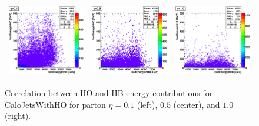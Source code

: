 \documentclass{cmspaper}
\begin{document}
\begin{figure}
 \centering
 \begin{tabular}{lll}
  \includegraphics[width=2in]{figs/h_EHO_EHB_corr_eta0.1.eps} &
  \includegraphics[width=2in]{figs/h_EHO_EHB_corr_eta0.5.eps} &
  \includegraphics[width=2in]{figs/h_EHO_EHB_corr_eta1.0.eps} \\
 \end{tabular}
 \caption{Correlation between HO and HB energy contributions for CaloJetsWithHO for parton $\eta=0.1$ (left), $0.5$ (center), and $1.0$ (right).}
 \label{fig:h_EHO_EHB}
\end{figure}
\end{document}
